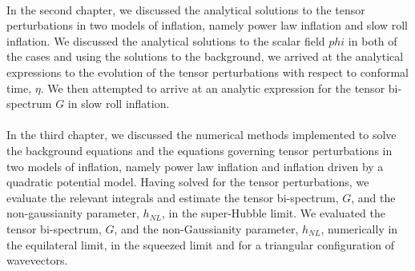 \documentclass[12pt,a4paper,oneside]{book}
\begin{document}
\paragraph*{} In the second chapter, we discussed the analytical solutions to 
the tensor perturbations in two models of inflation, namely power law inflation 
and slow roll inflation. We discussed the analytical 
solutions to the scalar field $phi$ in both of the cases and using the solutions 
to the background, we arrived at the analytical expressions to the evolution 
of the tensor perturbations with respect to conformal time, $\eta$. We then 
attempted to arrive at an analytic expression for the tensor bi-spectrum $G$ 
in slow roll inflation.

\paragraph*{} In the third chapter, we discussed the numerical methods implemented 
to solve the background equations and the equations governing tensor perturbations 
in two models of inflation, namely power law inflation and inflation driven by a 
quadratic potential model. 
Having solved for the tensor perturbations, we evaluate the relevant integrals and estimate 
the tensor bi-spectrum, $G$, and the non-gaussianity parameter, $h_{NL}$, in the 
super-Hubble limit. We evaluated the tensor bi-spectrum, $G$, and the non-Gaussianity 
parameter, $h_{NL}$, numerically in the equilateral limit, in the squeezed limit and for a 
triangular configuration of wavevectors.
\end{document}
